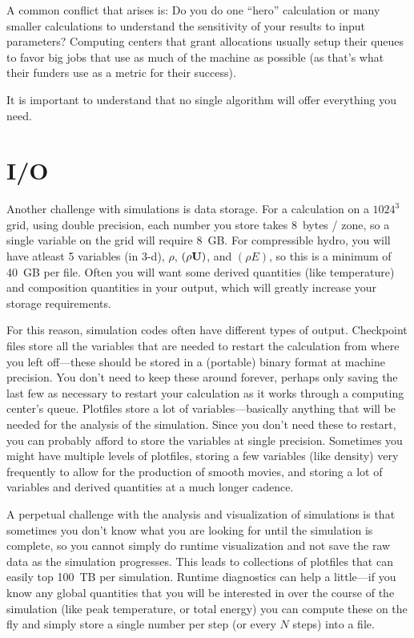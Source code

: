 A common conflict that arises is: Do you do one ``hero'' calculation
or many smaller calculations to understand the sensitivity of your
results to input parameters?  Computing centers that grant allocations
usually setup their queues to favor big jobs that use as much of the
machine as possible (as that's what their funders use as a metric for
their success).


It is important to understand that no single algorithm will offer everything
you need.


\section{I/O}

Another challenge with simulations is data storage.  For a calculation
on a $1024^3$ grid, using double precision, each number you store
takes 8~bytes / zone, so a single variable on the grid will require
8~GB.  For compressible hydro, you will have atleast 5 variables (in
3-d), $\rho$, $(\rho {\bf U})$, and $(\rho E)$, so this is a minimum of 40~GB per
file.  Often you will want some derived quantities (like temperature)
and composition quantities in your output, which will greatly increase
your storage requirements.

For this reason, simulation codes often have different types of
output.  Checkpoint files store all the variables that are needed to
restart the calculation from where you left off---these should be
stored in a (portable) binary format at machine precision.  You don't
need to keep these around forever, perhaps only saving the last few as
necessary to restart your calculation as it works through a computing
center's queue.  Plotfiles store a lot of variables---basically anything
that will be needed for the analysis of the simulation.  Since you don't
need these to restart, you can probably afford to store the variables
at single precision.  Sometimes you might have multiple levels of plotfiles,
storing a few variables (like density) very frequently to allow for 
the production of smooth movies, and storing a lot of variables and 
derived quantities at a much longer cadence.

A perpetual challenge with the analysis and visualization of
simulations is that sometimes you don't know what you are looking for
until the simulation is complete, so you cannot simply do runtime
visualization and not save the raw data as the simulation progresses.
This leads to collections of plotfiles that can easily top 100~TB per
simulation.  Runtime diagnostics can help a little---if you know any
global quantities that you will be interested in over the course of
the simulation (like peak temperature, or total energy) you can
compute these on the fly and simply store a single number per step (or
every $N$ steps) into a file.
